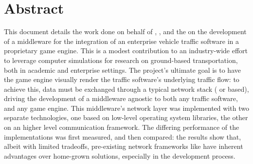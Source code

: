 \chapter*{Abstract}\label{ch:abstract}
\TOCsection{}

This document details the work done on behalf of , , and the  on the development of a middleware for the integration of an enterprise vehicle traffic software in a proprietary game engine. This is a modest contribution to an industry-wide effort to leverage computer simulations for research on ground-based transportation, both in academic and enterprise settings. The project's ultimate goal is to have the game engine visually render the traffic software's underlying traffic flow: to achieve this, data must be exchanged through a typical network stack ( or  based), driving the development of a middleware agnostic to both any traffic software, and any game engine. This middleware's network layer was implemented with two separate technologies, one based on low-level operating system libraries, the other on an higher level communication framework. The differing performance of the implementations was first measured, and then compared: the results show that, albeit with limited tradeoffs, pre-existing network frameworks like  have inherent advantages over home-grown solutions, especially in the development process.
